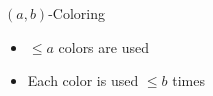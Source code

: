 \begin{frame}{$(a,b)$-Coloring}
\begin{itemize}

\item
$\leq a$ colors are used

\pause\item
Each color is used $\leq b$ times


\end{itemize}
\pause
\end{frame}